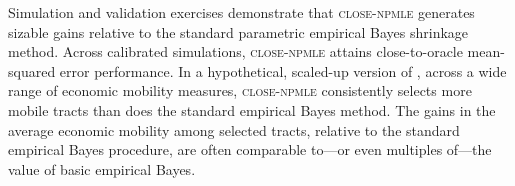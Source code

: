 \documentclass[12pt, reqno]{amsart}
\newcommand{\close}{\textsc{close}}
\newcommand{\npmle}{\textsc{npmle}}
\newcommand{\closenpmle}{\close-\npmle}
\numberwithin{equation}{section}
\begin{document}
Simulation and validation exercises demonstrate that \closenpmle{} generates sizable gains
relative to the standard parametric empirical Bayes shrinkage method. Across calibrated
simulations, \closenpmle{} attains close-to-oracle mean-squared error performance. In a
hypothetical, scaled-up version of \citet{bergman2019creating}, across a wide range of
economic mobility measures, \closenpmle{} consistently selects more mobile tracts than
does the standard empirical Bayes method. The gains in the average economic mobility among
selected tracts, relative to the standard empirical Bayes procedure, are often comparable
to---or even multiples of---the value of basic empirical Bayes.


\appendix

\end{document}
